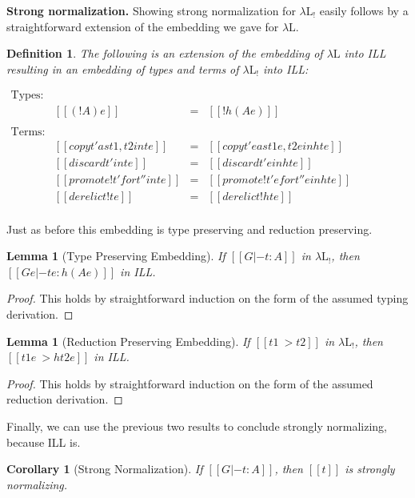 \documentclass{article}
\newtheorem{lemma}[theorem]{Lemma}
\newtheorem{corollary}[theorem]{Corollary}
\newtheorem{definition}[theorem]{Definition}
\begin{document}
\textbf{Strong normalization.} Showing strong normalization for
$\lambda\text{L}_!$ easily follows by a straightforward extension of
the embedding we gave for $\lambda\text{L}$.
\begin{definition}
  \label{def:embed-lambda-L!-in-ILL}
  The following is an extension of the embedding of $\lambda\text{L}$
  into ILL resulting in an embedding of types and terms of
  $\lambda\text{L}_!$ into ILL:
  \begin{center}
    \begin{math}
      \begin{array}{lrllllllllllllllllll}
        \text{Types:}\\
        & [[(! A) e]] & = & [[! h(A e)]]\\        
        \\
        \text{Terms:}\\
        & [[{copy t' as t1 , t2 in t} e]] & = & [[copy t' e as t1 e , t2 e in h{t e}]]\\
        & [[{discard t' in t} e]] & = & [[discard t' e in h{t e}]]\\
        & [[{promote! t' for t'' in t} e]] & = & [[promote! t' e for t'' e in h{t e}]]\\
        & [[{derelict! t} e]] & = & [[derelict! h{t e}]]\\
      \end{array}
    \end{math}
  \end{center}
\end{definition}

\noindent
Just as before this embedding is type preserving and reduction preserving.
\begin{lemma}[Type Preserving Embedding]
  \label{lemma:type_preserving_embedding_lambdaL!}
  If $[[G |- t : A]]$ in $\lambda\text{L}_!$, then
  $[[G e |- t e : h(A e)]]$ in ILL.
\end{lemma}
\begin{proof}
  This holds by straightforward induction on the form of the assumed
  typing derivation.
\end{proof}

\begin{lemma}[Reduction Preserving Embedding]
  \label{lemma:reduction_preserving_embedding_lambdaL!}
  If $[[t1 ~> t2]]$ in $\lambda\text{L}_!$, then $[[t1 e ~> h{t2 e}]]$
  in ILL.
\end{lemma}
\begin{proof}
  This holds by straightforward induction on the form of the assumed
  reduction derivation.
\end{proof}
\noindent
Finally, we can use the previous two results to conclude strongly
normalizing, because ILL is.
\begin{corollary}[Strong Normalization]
  \label{corollary:strong_normalization_lambdaL!}
  If $[[G |- t : A]]$, then $[[t]]$ is strongly normalizing.
\end{corollary}
\end{document}
